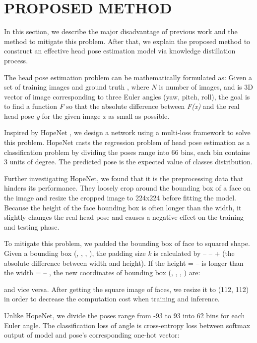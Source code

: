\documentclass[a4paper,twoside]{article}
\begin{document}
\section{\uppercase{Proposed Method}}
In this section, we describe the major disadvantage of previous work and the method to mitigate this problem. After that, we explain the proposed method to construct an effective head pose estimation model via knowledge distillation process.

The head pose estimation problem can be mathematically formulated as: Given a set of training images \textit{} and ground truth \textit{}, where \textit{N} is number of images, and \textit{} is 3D vector of image \textit{} corresponding to three Euler angles (yaw, pitch, roll), the goal is to find a function \textit{F} so that the absolute difference between \textit{F(x)} and the real head pose \textit{y} for the given image \textit{x} as small as possible.

Inspired by HopeNet \cite{ruiz2018fine}, we design a network using a multi-loss framework to solve this problem. HopeNet casts the regression problem of head pose estimation as a classification problem by dividing the poses range into 66 bins, each bin contains 3 units of degree. The predicted pose is the expected value of classes distribution.

Further investigating  HopeNet, we found that it is the preprocessing data that hinders its performance. They loosely crop around the bounding box of a face on the image and resize the cropped image to 224x224 before fitting the model. Because the height of the face bounding box is often longer than the width, it slightly changes the real head pose and causes a negative effect on the training and testing phase.

To mitigate this problem, we padded the bounding box of face to squared shape. Given a bounding box (, , , ), the padding size \textit{k} is calculated by  –  –  +  (the absolute difference between width and height). If the height  =  –  is longer than the width  =  – , the new coordinates of bounding box (, , , ) are:

and vice versa. After getting the square image of faces, we resize it to (112, 112) in order to decrease the computation cost when training and inference.

Unlike HopeNet, we divide the poses range from -93 to 93 into 62 bins for each Euler angle. The classification loss of angle is cross-entropy loss between softmax output of model and pose’s corresponding one-hot vector:
\end{document}
